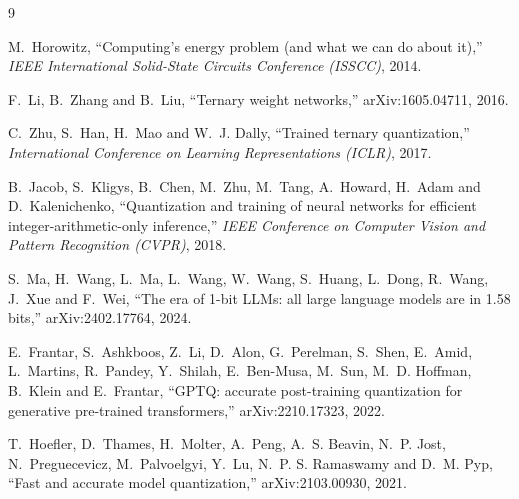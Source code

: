 \documentclass[11pt,a4paper]{article}
\begin{document}
\newpage
\begin{thebibliography}{9}

  M.~Horowitz,
  ``Computing's energy problem (and what we can do about it),''
  \emph{IEEE International Solid-State Circuits Conference (ISSCC)}, 2014.

  F.~Li, B.~Zhang and B.~Liu,
  ``Ternary weight networks,''
  arXiv:1605.04711, 2016.

  C.~Zhu, S.~Han, H.~Mao and W.~J. Dally,
  ``Trained ternary quantization,''
  \emph{International Conference on Learning Representations (ICLR)}, 2017.

  B.~Jacob, S.~Kligys, B.~Chen, M.~Zhu, M.~Tang, A.~Howard, H.~Adam and
  D.~Kalenichenko,
  ``Quantization and training of neural networks for efficient
  integer-arithmetic-only inference,''
  \emph{IEEE Conference on Computer Vision and Pattern Recognition (CVPR)}, 2018.

  S.~Ma, H.~Wang, L.~Ma, L.~Wang, W.~Wang, S.~Huang, L.~Dong, R.~Wang,
  J.~Xue and F.~Wei,
  ``The era of 1-bit LLMs: all large language models are in 1.58 bits,''
  arXiv:2402.17764, 2024.

  E.~Frantar, S.~Ashkboos, Z.~Li, D.~Alon, G.~Perelman, S.~Shen, E.~Amid,
  L.~Martins, R.~Pandey, Y.~Shilah, E.~Ben-Musa, M.~Sun, M.~D. Hoffman,
  B.~Klein and E.~Frantar,
  ``GPTQ: accurate post-training quantization for generative pre-trained
  transformers,''
  arXiv:2210.17323, 2022.

  T.~Hoefler, D.~Thames, H.~Molter, A.~Peng, A.~S. Beavin, N.~P. Jost,
  N.~Preguecevicz, M.~Palvoelgyi, Y.~Lu, N.~P. S. Ramaswamy and D.~M. Pyp,
  ``Fast and accurate model quantization,''
  arXiv:2103.00930, 2021.

\end{thebibliography}
\end{document}
